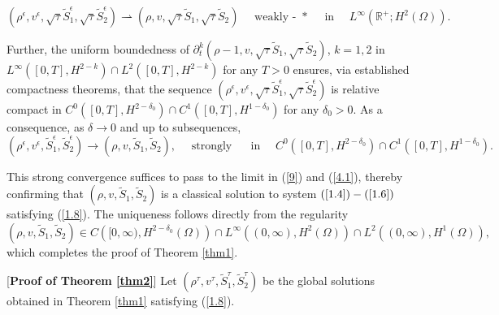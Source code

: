 \documentclass[10pt,reqno]{amsart}
\numberwithin{equation}{section}
\begin{document}
	$$
	(\rho^\epsilon,v^\epsilon, \sqrt{\tau}\tilde{S}_1^{\epsilon}, \sqrt{\tau}\tilde{S}_2^{\epsilon}) \rightharpoonup
	(\rho,v, \sqrt{\tau}\tilde{S}_1, \sqrt{\tau}\tilde{S}_2) \quad \text { weakly - } * \quad \text { in } \quad L^{\infty}\left(\mathbb{R}^{+} ; H^2(\Omega)\right).
	$$
	
	Further, the uniform boundedness of $\partial_{t}^k(\rho-1, v, \sqrt{\tau} \tilde{S}_1, \sqrt{\tau} \tilde{S}_2)$, $k=1,2$ in
	$L^{\infty}\left([0, T], H^{2-k}\right) \cap L^2\left([0, T], H^{2-k}\right)$ for any $T>0$ ensures, via established compactness theorems, that the sequence $(\rho^\epsilon,v^\epsilon, \sqrt{\tau}\tilde{S}_1^{\epsilon}, \sqrt{\tau}\tilde{S}_2^{\epsilon})$ is relative compact in
	$C^0\left([0, T], H^{2-\delta_0}\right) \cap C^1\left([0, T], H^{1-\delta_0}\right)$ for any $\delta_0>0$. 
	As a consequence, as $\delta\rightarrow 0$ and up to subsequences,
	$$
	(\rho^\epsilon,v^\epsilon, \tilde{S}_1^{\epsilon}, \tilde{S}_2^{\epsilon}) \rightarrow(\rho,v, \tilde{S}_1, \tilde{S}_2), \quad \text { strongly } \quad \text { in } \quad C^0\left([0, T], H^{2-\delta_0}\right) \cap C^1\left([0, T], H^{1-\delta_0}\right).
	$$
	
	This strong convergence suffices to pass to the limit in (\ref{9}) and (\ref{4.1}), thereby confirming that 
	$(\rho,v, \tilde{S}_1, \tilde{S}_2)$ is a classical solution to system $(\ref{1.4})-(\ref{1.6})$ satisfying (\ref{1.8}). The uniqueness follows directly from the regularity
	$$
	(\rho, v, \tilde{S}_1, \tilde{S}_2) \in C\left([0, \infty), H^{2-\delta_0}(\Omega)\right) \cap L^{\infty}\left((0, \infty), H^2(\Omega)\right) \cap L^2\left((0, \infty), H^1(\Omega)\right),
	$$
	which completes the proof of Theorem \ref{thm1}.
	
	
	
	[\textbf{Proof of Theorem \ref{thm2}}]
	Let $(\rho^{\tau},v^{\tau},\tilde{S}_1^{\tau},\tilde{S}_2^{\tau})$ be the global solutions obtained in Theorem \ref{thm1} satisfying (\ref{1.8}). 
	
\end{document}
